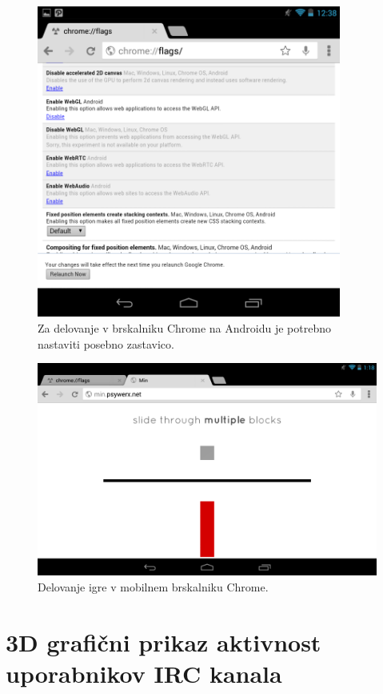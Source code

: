 \begin{figure}
\begin{center}
\includegraphics[width=10cm]{pic/min-chrome-flag.png}
\end{center}
\caption{Za delovanje v brskalniku Chrome na Androidu je potrebno nastaviti posebno zastavico.}
\label{minchromeflag}
\end{figure} 

\begin{figure}
\begin{center}
\includegraphics[width=12cm]{pic/min-chrome.png}
\end{center}
\caption{Delovanje igre v mobilnem brskalniku Chrome.}
\label{minchrome}
\end{figure}

\section{3D grafični prikaz aktivnost uporabnikov IRC kanala}

